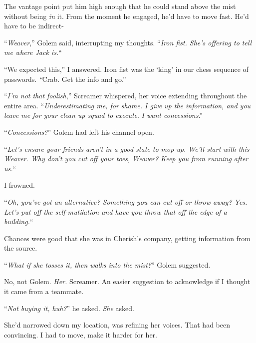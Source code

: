 The vantage point put him high enough that he could stand above the mist without being \emph{in} it.  From the moment he engaged, he'd have to move fast.  He'd have to be indirect-



``\emph{Weaver},'' Golem said, interrupting my thoughts.  ``\emph{Iron fist.  She's offering to tell me where Jack is.}``



``We expected this,'' I answered.  Iron fist was the `king' in our chess sequence of passwords.  \emph{``}Crab.  Get the info and go.''



``\emph{I'm not that foolish},'' Screamer whispered, her voice extending throughout the entire area.  ``\emph{Underestimating me, for shame.  I give up the information, and you leave me for your clean up squad to execute}.  \emph{I want concessions}.''



``\emph{Concessions?}''  Golem had left his channel open.



``\emph{Let's ensure your friends aren't in a good state to mop up.  We'll start with this Weaver.  Why don't you cut off your toes, Weaver?  Keep you from running after us.}``



I frowned.



``\emph{Oh, you've got an alternative?  Something you can cut off or throw away?  Yes.  Let's put off the self-mutilation and have you throw that off the edge of a building.}``



Chances were good that she was in Cherish's company, getting information from the source.



``\emph{What if she tosses it, then walks into the mist?}'' Golem suggested.



No, not Golem.  \emph{Her.}  Screamer.  An easier suggestion to acknowledge if I thought it came from a teammate.



``\emph{Not buying it, huh?}'' he asked.  \emph{She} asked.



She'd narrowed down my location, was refining her voices.  That had been convincing.  I had to move, make it harder for her.



